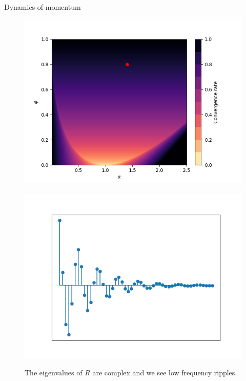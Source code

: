 \documentclass[11pt,compress,t,notes=noshow, xcolor=table]{beamer}
\begin{document}
\begin{vbframe}{Dynamics of momentum}
\framebreak


\framebreak
\vspace*{1.0cm}
\begin{figure}
	\includegraphics[height=0.35\textwidth, keepaspectratio]{figure_man/momentum_conv_ripples.png} ~~ \includegraphics[height=0.35\textwidth, keepaspectratio]{figure_man/momentum_ripples.png} \\
	\begin{footnotesize} 
		The eigenvalues of $R$ are complex and we see low frequency ripples. 
	\end{footnotesize}
\end{figure}


\end{vbframe}
\end{document}

